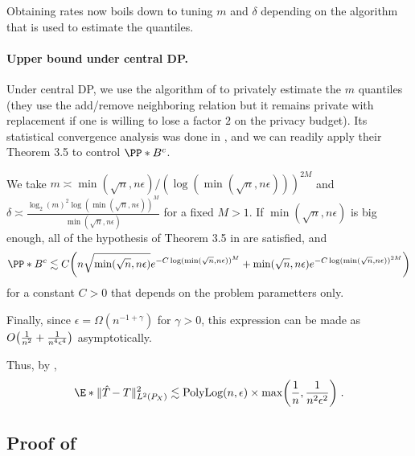 \documentclass{article}
\newcommand{\1}{\mathds{1}}
\DeclarePairedDelimiter{\paren}{\lparen}{\rparen}
\theoremstyle{plain}
\theoremstyle{definition}
\theoremstyle{remark}
\begin{document}
Obtaining rates now boils down to tuning $m$ and $\delta$ depending on the algorithm that is used to estimate the quantiles.

\paragraph{Upper bound under central DP.}

Under central DP, we use the algorithm of \cite{kaplan2022differentially} to privately estimate the $m$ quantiles (they use the add/remove neighboring relation but it remains private with replacement if one is willing to lose a factor $2$ on the privacy budget). Its statistical convergence analysis was done in \cite{lalanne2023private}, and we can readily apply their Theorem 3.5 to control $\PP*{B^c}$.

We take $m \asymp \min(\sqrt{n}, n \epsilon) / (\log(\min(\sqrt{n}, n \epsilon)))^{2M}$ and $\delta \asymp \frac{\log_2(m)^2 \log(\min(\sqrt{n}, n \epsilon))^M}{\min(\sqrt{n}, n \epsilon)}$ for a fixed $M > 1$.
If $\min(\sqrt{n}, n \epsilon)$ is big enough, all of the hypothesis of Theorem 3.5 in \cite{lalanne2023private} are satisfied, and
\begin{equation}
    \PP*{B^c} \lesssim C \paren*{n \sqrt{\min(\sqrt{n}, n \epsilon)} e^{-C\log(\min(\sqrt{n}, n \epsilon))^M}
    + \min(\sqrt{n}, n \epsilon) e^{-C \log(\min(\sqrt{n}, n \epsilon))^{2M}}}
\end{equation}
for a constant $C>0$ that depends on the problem parametters only.

Finally, since $\epsilon = \Omega(n^{-1+\gamma})$ for $\gamma > 0$, this expression can be made as $O\paren*{\frac{1}{n^2} + \frac{1}{n^4 \epsilon^4}}$ asymptotically.

Thus, by , 
\begin{equation}
    \E*{\| \hat{T}_{} - T \|^2_{L^2(P_X)}}
    \lesssim \textrm{PolyLog}(n, \epsilon) \times \max\paren*{\frac{1}{n}, \frac{1}{n^2 \epsilon^2}} \;.
\end{equation}



\subsection{Proof of }
\label{proof_of_th:lower_bound}
\end{document}
